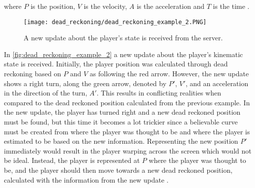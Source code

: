 where $ P $ is the position, $ V $ is the velocity, $ A $ is the acceleration and $T$ is the time \cite{deadreckoning}.
\begin{figure}[H]
    \centering
    \texttt{[image: dead\_reckoning/dead\_reckoning\_example\_2.PNG]}
    \caption{A new update about the player's state is received from the server.}
    \label{fig:dead_reckoning_example_2}
\end{figure}
\noindent
In \autoref{fig:dead_reckoning_example_2} a new update about the player's kinematic state is received.
Initially, the player position was calculated through dead reckoning based on $P$ and $V$ as following the red arrow.
However, the new update shows a right turn, along the green arrow, denoted by $P'$, $V'$, and an acceleration in the direction of the turn, $A'$.
This results in conflicting realities when compared to the dead reckoned position calculated from the previous example. 
In the new update, the player has turned right and a new dead reckoned position must be found, but this time it becomes a lot trickier since a believable curve must be created from where the player was thought to be and where the player is estimated to be based on the new information.
Representing the new position $P'$ immediately would result in the player warping across the screen which would not be ideal.
Instead, the player is represented at $ P $ where the player was thought to be, and the player should then move towards a new dead reckoned position, calculated with the information from the new update \cite{deadreckoning}.


